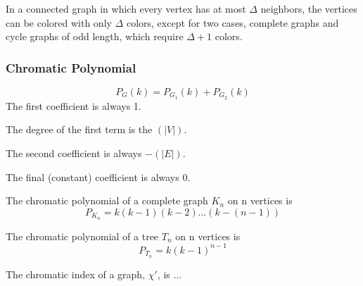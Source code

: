 

\begin{theorem}
    In a connected graph in which every vertex has at most $\Delta$ neighbors, the vertices can be colored with only $\Delta$ colors, except for two cases, complete graphs and cycle graphs of odd length, which require $\Delta+1$ colors.
\end{theorem}

\subsubsection{Chromatic Polynomial}
\[
    P_G (k) = P_{G_1} (k) + P_{G_2} (k) 
\]
The first coefficient is always 1.

The degree of the first term is the $(|V|)$.

The second coefficient is always $-(|E|)$.

The final (constant) coefficient is always 0.

\begin{definition}
    The chromatic polynomial of a complete graph $K_n$ on n vertices is 
    \[P_{K_n}=k(k-1)(k-2)...(k-(n-1))\]
\end{definition}

\begin{definition}
    The chromatic polynomial of a tree $T_n$ on n vertices is \[P_{T_n}=k(k-1)^{n-1}\]
\end{definition}



\begin{definition}
    The chromatic index of a graph, $\chi'$, is ...
\end{definition}
